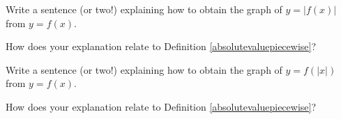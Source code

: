\documentclass{ximera}
\begin{document}
\begin{question}
Write a sentence (or two!) explaining how to obtain the graph of $y=|f(x)|$ from $y = f(x)$.  

\end{question}

\begin{question}
How does your explanation relate to Definition \ref{absolutevaluepiecewise}?

\end{question}

\begin{question}
Write a sentence (or two!) explaining how to obtain the graph of $y=f(|x|)$ from $y = f(x)$.  

\end{question}

\begin{question}
How does your explanation relate to Definition \ref{absolutevaluepiecewise}?

\end{question}
\end{document}
